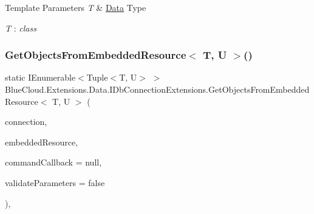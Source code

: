 \begin{DoxyTemplParams}{Template Parameters}
{\em T} & \mbox{\hyperlink{namespace_blue_cloud_1_1_extensions_1_1_data}{Data}} Type\\
\hline
\end{DoxyTemplParams}
\begin{Desc}
\item[Type Constraints]\begin{description}
\item[{\em T} : {\em class}]\end{description}
\end{Desc}
\mbox{\label{class_blue_cloud_1_1_extensions_1_1_data_1_1_i_db_connection_extensions_a28bbe4b7cb773c4b8738bed7826f20d5}} 
\subsubsection{\texorpdfstring{Get\+Objects\+From\+Embedded\+Resource$<$ T, U $>$()}{GetObjectsFromEmbeddedResource< T, U >()}\hspace{0.1cm}{\footnotesize\ttfamily [1/2]}}
{\footnotesize\ttfamily static I\+Enumerable$<$Tuple$<$T, U$>$ $>$ Blue\+Cloud.\+Extensions.\+Data.\+I\+Db\+Connection\+Extensions.\+Get\+Objects\+From\+Embedded\+Resource$<$ T, U $>$ (\begin{DoxyParamCaption}\item[{this I\+Db\+Connection}]{connection,  }\item[{string}]{embedded\+Resource,  }\item[{Action$<$ I\+Db\+Command $>$}]{command\+Callback = {\ttfamily null},  }\item[{bool}]{validate\+Parameters = {\ttfamily false} }\end{DoxyParamCaption})\hspace{0.3cm}{\ttfamily [inline]}, {\ttfamily [static]}}



